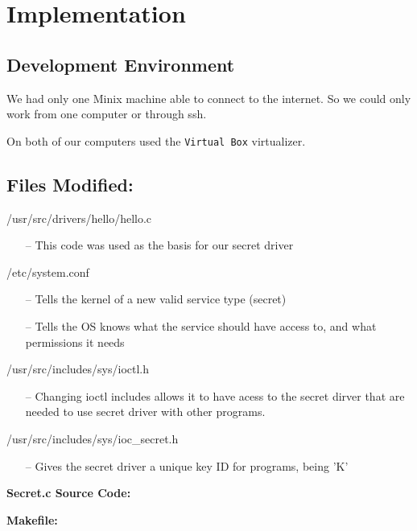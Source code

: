 \documentclass[11pt]{article}
\begin{document}
\section{Implementation}
\begin{adjustwidth}{.2in}{}{

   \subsection{Development Environment}
   
      We had only one Minix machine able to connect to the internet. So we
         could only work from one computer or through ssh.

      On both of our computers used the {\tt Virtual Box} virtualizer.

   \subsection{Files Modified:}


      /usr/src/drivers/hello/hello.c
      \begin{itemize}
         \item[--] This code was used as the basis for our secret driver
      \end{itemize}
 

      /etc/system.conf
         \begin{itemize}
            \item[--] Tells the kernel of a new valid service type (secret)
            \item[--] Tells the OS knows what the service should have access to, and what permissions it needs
      \end{itemize}

      

      /usr/src/includes/sys/ioctl.h
      \begin{itemize}
         \item[--] Changing ioctl includes allows it to have acess to the secret dirver that are needed to use secret driver with other programs.
      \end{itemize}

      
      /usr/src/includes/sys/ioc\_secret.h
      \begin{itemize}
         \item[--] Gives the secret driver a unique key ID for programs, being 'K'
      \end{itemize}
      

   \newpage
   {\bf Secret.c Source Code:}
   \lstset{style=Cstyle}
    

   \bigskip

   {\bf Makefile:}
    

}\end{adjustwidth}
\end{document}
